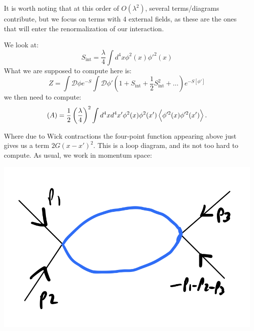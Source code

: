 It is worth noting that at this order of $O(\lambda^2)$, several terms/diagrams contribute, but we focus on terms with 4 external fields, as these are the ones that will enter the renormalization of our interaction.

We look at:
\begin{equation}
    S_{\text{int}} = \frac{\lambda}{4}\int d^4x \phi^2(x)\phi'^2(x)
\end{equation}
What we are supposed to compute here is:
\begin{equation}
    Z = \int \mathcal{D}\phi e^{-S}\int \mathcal{D}\phi'\left(1 + S_{\text{int}} + \frac{1}{2}S_{\text{int}}^2 + \ldots \right)e^{-S[\phi']}
\end{equation}
we then need to compute:
\begin{equation}
    (A) = \frac{1}{2}\left(\frac{\lambda}{4}\right)^2\int d^4x d^4x' \phi^2(x)\phi^2(x')\left< \phi'^2(x)\phi'^2(x') \right>.
\end{equation}

Where due to Wick contractions the four-point function appearing above just gives us a term $2G(x - x')^2$. This is a loop diagram, and its not too hard to compute. As usual, we work in momentum space:

\begin{center}
    \includegraphics[scale=0.3]{Lectures/Figures/lec15-momentum.png}
\end{center}

